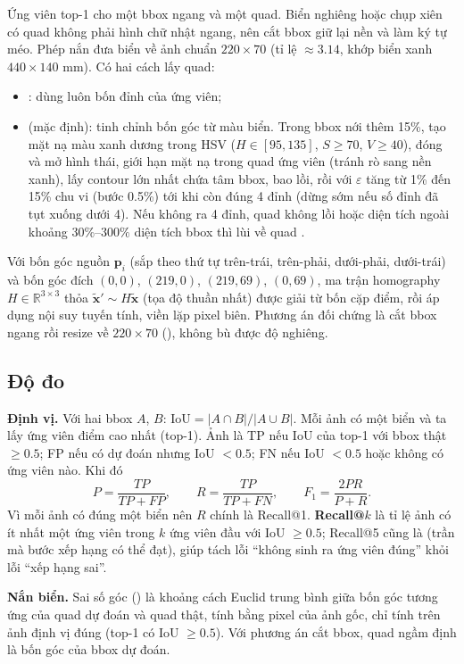 Ứng viên top-1 cho một bbox ngang và một quad. Biển nghiêng hoặc chụp xiên có quad không phải hình chữ nhật ngang, nên cắt bbox giữ lại nền và làm ký tự méo. Phép nắn đưa biển về ảnh chuẩn $220\times 70$ (tỉ lệ $\approx 3.14$, khớp biển xanh $440\times 140$ mm). Có hai cách lấy quad:
\begin{itemize}
  \item {}: dùng luôn bốn đỉnh  của ứng viên;
  \item {} (mặc định): tinh chỉnh bốn góc từ màu biển. Trong bbox nới thêm 15\%, tạo mặt nạ màu xanh dương trong HSV ($H\in[95,135]$, $S\ge 70$, $V\ge 40$), đóng và mở hình thái, giới hạn mặt nạ trong quad ứng viên (tránh rò sang nền xanh), lấy contour lớn nhất chứa tâm bbox, bao lồi, rồi  với $\varepsilon$ tăng từ 1\% đến 15\% chu vi (bước 0.5\%) tới khi còn đúng 4 đỉnh (dừng sớm nếu số đỉnh đã tụt xuống dưới 4). Nếu không ra 4 đỉnh, quad không lồi hoặc diện tích ngoài khoảng $30\%$--$300\%$ diện tích bbox thì lùi về quad .
\end{itemize}
Với bốn góc nguồn $\mathbf{p}_i$ (sắp theo thứ tự trên-trái, trên-phải, dưới-phải, dưới-trái) và bốn góc đích $(0,0)$, $(219,0)$, $(219,69)$, $(0,69)$, ma trận homography $H\in\mathbb{R}^{3\times 3}$ thỏa $\tilde{\mathbf{x}}'\sim H\tilde{\mathbf{x}}$ (tọa độ thuần nhất) được giải từ bốn cặp điểm, rồi áp dụng nội suy tuyến tính, viền lặp pixel biên. Phương án đối chứng là cắt bbox ngang rồi resize về $220\times 70$ (), không bù được độ nghiêng.

\subsection{Độ đo}
\label{sec:metrics}

\textbf{Định vị.} Với hai bbox $A$, $B$: $\mathrm{IoU}=|A\cap B|/|A\cup B|$. Mỗi ảnh có một biển và ta lấy ứng viên điểm cao nhất (top-1). Ảnh là TP nếu IoU của top-1 với bbox thật $\ge 0.5$; FP nếu có dự đoán nhưng IoU $<0.5$; FN nếu IoU $<0.5$ hoặc không có ứng viên nào. Khi đó
\[
P=\frac{TP}{TP+FP},\qquad R=\frac{TP}{TP+FN},\qquad F_1=\frac{2PR}{P+R}.
\]
Vì mỗi ảnh có đúng một biển nên $R$ chính là Recall@1. \textbf{Recall@$k$} là tỉ lệ ảnh có ít nhất một ứng viên trong $k$ ứng viên đầu với IoU $\ge 0.5$; Recall@5 cũng là  (trần mà bước xếp hạng có thể đạt), giúp tách lỗi ``không sinh ra ứng viên đúng'' khỏi lỗi ``xếp hạng sai''.

\textbf{Nắn biển.} Sai số góc () là khoảng cách Euclid trung bình giữa bốn góc tương ứng của quad dự đoán và quad thật, tính bằng pixel của ảnh gốc, chỉ tính trên ảnh định vị đúng (top-1 có IoU $\ge 0.5$). Với phương án cắt bbox, quad ngầm định là bốn góc của bbox dự đoán.

